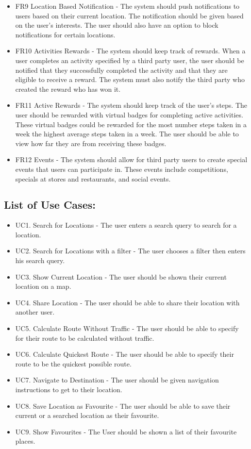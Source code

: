 \documentclass[11pt]{article}
\begin{document}
\begin{itemize}
		\item FR9 Location Based Notification - The system should push notifications to users based on their current location. The notification should be given based on the user's interests. The user should also have an option to block notifications for certain locations. 
		
		\item FR10 Activities Rewards - The system should keep track of rewards. When a user completes an activity specified by a third party user, the user should be notified that they successfully completed the activity and that they are eligible to receive a reward. The system must also notify the third party who created the reward who has won it.
		
		\item FR11 Active Rewards - The system should keep track of the user's steps. The user should be rewarded with virtual badges for completing active activities. These virtual badges could be rewarded for the most number steps taken in a week the highest average steps taken in a week. The user should be able to view how far they are from receiving these badges.
		
		\item FR12 Events - The system should allow for third party users to create special events that users can participate in. These events include competitions, specials at stores and restaurants, and social events. 
	\end{itemize}
	
	\subsection{List of Use Cases:}
	
	\begin{itemize}
		\item UC1. Search for Locations - The user enters a search query to search for a location.
		\item UC2. Search for Locations with a filter - The user chooses a filter then enters his search query.
		\item UC3. Show Current Location - The user should be shown their current location on a map.
		\item UC4. Share Location - The user should be able to share their location with another user.
		
		\item UC5. Calculate Route Without Traffic - The user should be able to specify for their route to be calculated without traffic.
		\item UC6. Calculate Quickest Route - The user should be able to specify their route to be the quickest possible route.
		\item UC7. Navigate to Destination - The user should be given navigation instructions to get to their location.
		\item UC8. Save Location as Favourite - The user should be able to save their current or a searched location as their favourite.
		\item UC9. Show Favourites - The User should be shown a list of their favourite places.
	\end{itemize}
	
	
	
\end{document}

